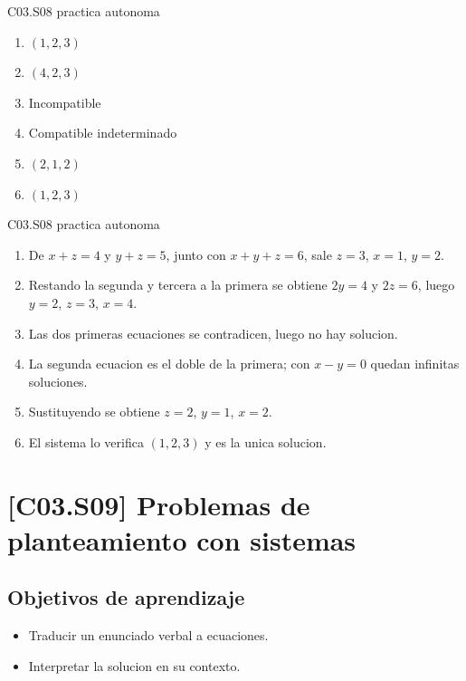 \begin{shortanswer}{C03.S08 practica autonoma}
\begin{enumerate}[label=\textbf{PX-C03.S08-\arabic*:}, leftmargin=*]
  \item \((1,2,3)\)
  \item \((4,2,3)\)
  \item Incompatible
  \item Compatible indeterminado
  \item \((2,1,2)\)
  \item \((1,2,3)\)
\end{enumerate}
\end{shortanswer}

\begin{fullsolution}{C03.S08 practica autonoma}
\begin{enumerate}[label=\textbf{PX-C03.S08-\arabic*:}, leftmargin=*]
  \item De \(x+z=4\) y \(y+z=5\), junto con \(x+y+z=6\), sale \(z=3\), \(x=1\), \(y=2\).
  \item Restando la segunda y tercera a la primera se obtiene \(2y=4\) y \(2z=6\), luego \(y=2\), \(z=3\), \(x=4\).
  \item Las dos primeras ecuaciones se contradicen, luego no hay solucion.
  \item La segunda ecuacion es el doble de la primera; con \(x-y=0\) quedan infinitas soluciones.
  \item Sustituyendo se obtiene \(z=2\), \(y=1\), \(x=2\).
  \item El sistema lo verifica \((1,2,3)\) y es la unica solucion.
\end{enumerate}
\end{fullsolution}

\section{[C03.S09] Problemas de planteamiento con sistemas}

\subsection*{Objetivos de aprendizaje}
\begin{itemize}
  \item Traducir un enunciado verbal a ecuaciones.
  \item Interpretar la solucion en su contexto.
\end{itemize}

